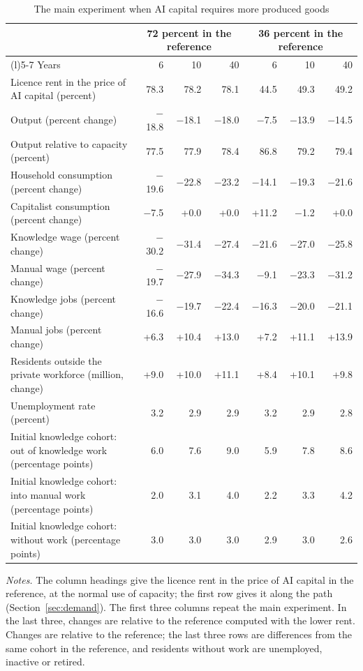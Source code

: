 \begin{table}[htbp]\centering\small
\caption{The main experiment when AI capital requires more produced goods}\label{tab:rentshare}
\begin{tabularx}{\linewidth}{@{}>{\raggedright\arraybackslash}Xrrrrrr@{}}\toprule
 & \multicolumn{3}{c}{72 percent in the reference} & \multicolumn{3}{c}{36 percent in the reference} \\\cmidrule(lr){2-4}\cmidrule(l){5-7}
Years & 6 & 10 & 40 & 6 & 10 & 40 \\
\midrule Licence rent in the price of AI capital (percent) & 78.3 & 78.2 & 78.1 & 44.5 & 49.3 & 49.2 \\
Output (percent change) & $-$18.8 & $-$18.1 & $-$18.0 & $-$7.5 & $-$13.9 & $-$14.5 \\
Output relative to capacity (percent) & 77.5 & 77.9 & 78.4 & 86.8 & 79.2 & 79.4 \\
Household consumption (percent change) & $-$19.6 & $-$22.8 & $-$23.2 & $-$14.1 & $-$19.3 & $-$21.6 \\
Capitalist consumption (percent change) & $-$7.5 & +0.0 & +0.0 & +11.2 & $-$1.2 & +0.0 \\
Knowledge wage (percent change) & $-$30.2 & $-$31.4 & $-$27.4 & $-$21.6 & $-$27.0 & $-$25.8 \\
Manual wage (percent change) & $-$19.7 & $-$27.9 & $-$34.3 & $-$9.1 & $-$23.3 & $-$31.2 \\
Knowledge jobs (percent change) & $-$16.6 & $-$19.7 & $-$22.4 & $-$16.3 & $-$20.0 & $-$21.1 \\
Manual jobs (percent change) & +6.3 & +10.4 & +13.0 & +7.2 & +11.1 & +13.9 \\
Residents outside the private workforce (million, change) & +9.0 & +10.0 & +11.1 & +8.4 & +10.1 & +9.8 \\
Unemployment rate (percent) & 3.2 & 2.9 & 2.9 & 3.2 & 2.9 & 2.8 \\
Initial knowledge cohort: out of knowledge work (percentage points) & 6.0 & 7.6 & 9.0 & 5.9 & 7.8 & 8.6 \\
Initial knowledge cohort: into manual work (percentage points) & 2.0 & 3.1 & 4.0 & 2.2 & 3.3 & 4.2 \\
Initial knowledge cohort: without work (percentage points) & 3.0 & 3.0 & 3.0 & 2.9 & 3.0 & 2.6 \\
\bottomrule\end{tabularx}
\par\smallskip\begin{minipage}{\linewidth}\footnotesize\emph{Notes.} The column headings give the licence rent in the price of AI capital in the reference, at the normal use of capacity; the first row gives it along the path (Section~\ref{sec:demand}). The first three columns repeat the main experiment. In the last three, changes are relative to the reference computed with the lower rent. Changes are relative to the reference; the last three rows are differences from the same cohort in the reference, and residents without work are unemployed, inactive or retired.\end{minipage}
\end{table}
